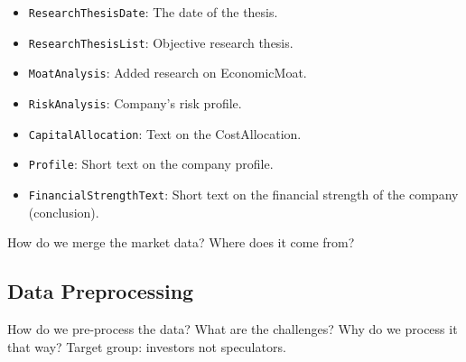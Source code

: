 \documentclass[conference]{IEEEtran}
\begin{document}
\begin{itemize}
  \item \texttt{ResearchThesisDate}: The date of the thesis.
  \item \texttt{ResearchThesisList}: Objective research thesis.
  \item \texttt{MoatAnalysis}: Added research on EconomicMoat.
  \item \texttt{RiskAnalysis}: Company's risk profile. 
  \item \texttt{CapitalAllocation}: Text on the CostAllocation. 
  \item \texttt{Profile}: Short text on the company profile.
  \item \texttt{FinancialStrengthText}: Short text on the financial strength of the company (conclusion).
\end{itemize}

How do we merge the market data? Where does it come from?
\subsection{Data Preprocessing}%
How do we pre-process the data? What are the challenges?
Why do we process it that way? Target group: investors not speculators.
\end{document}
